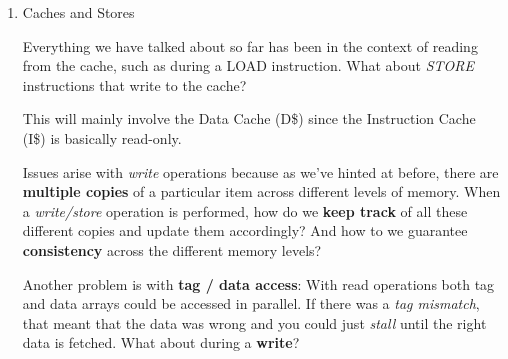 \documentclass[12pt]{article}
\newenvironment{QandA}{\begin{enumerate}[label=\bfseries\arabic*.]\bfseries}
                      {\end{enumerate}}
\newenvironment{answered}{\par\quad\normalfont}{}
\begin{document}
\begin{QandA}
\begin{answered}
\textbf{Replacement Policies}

With N-Way Associative Caches, what happens during a \textit{Cache Miss}? Which block in a set should be evicted?
\begin{itemize}
    \item Random
    \item FIFO
    \item \textbf{Least Recently Used (LRU)} : works well in practice. Requires additional \textbf{LRU bits} - for a 2-Way Set Associative cache, this is just a single bit.
    \item Not Most Recently Used (NMRU) : approximation of LRU, easier to implement
    \item Belady's : replace what will be used furthest in the future - impractical but good for simulation and pre-recorded traces 
\end{itemize}

\textit{Q: What is the impact of associativity on \textbf{performance}?}

\quad With higher associative caches, you will have a lower $\%_{misses}$, but at a certain point you will have diminishing returns because $t_{access}$ will increase. 

\textit{Q: Does associativity need to be powers of 2?}

\quad No it does not!
\end{answered}

\item Caches and Stores
\begin{answered}
Everything we have talked about so far has been in the context of reading from the cache, such as during a LOAD instruction. What about \textit{STORE} instructions that write to the cache?

\quad This will mainly involve the Data Cache (D\$) since the Instruction Cache (I\$) is basically read-only. 

\quad Issues arise with \textit{write} operations because as we've hinted at before, there are \textbf{multiple copies} of a particular item across different levels of memory. When a \textit{write/store} operation is performed, how do we \textbf{keep track} of all these different copies and update them accordingly? And how to we guarantee \textbf{consistency} across the different memory levels?

\quad Another problem is with \textbf{tag / data access}: With read operations both tag and data arrays could be accessed in parallel. If there was a \textit{tag mismatch}, that meant that the data was wrong and you could just \textit{stall} until the right data is fetched. What about during a \textbf{write}?


\end{answered}
\end{QandA}
\end{document}
